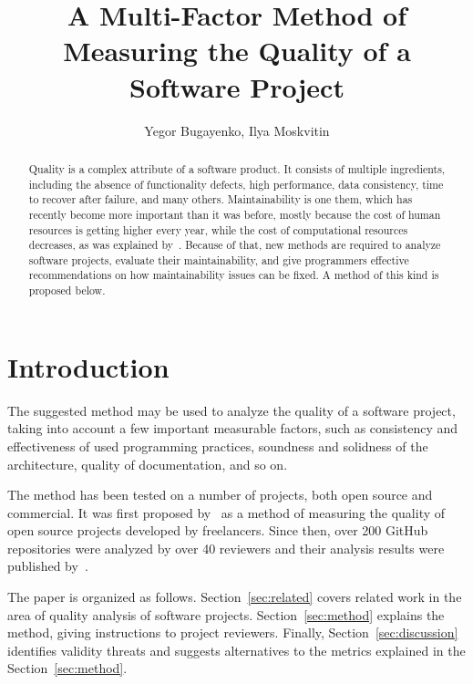 \documentclass[12pt,oneside]{article}
\title{A Multi-Factor Method of Measuring the Quality of a Software Project}
\author{Yegor Bugayenko, Ilya Moskvitin}
\begin{document}
\raggedbottom
\raggedright
\setlength{\topskip}{6pt}
\setlength{\parindent}{0pt} %
\setlength{\parskip}{6pt} %

\maketitle

\begin{abstract}
Quality is a complex attribute of a software product. It consists of
multiple ingredients, including the absence of functionality defects,
high performance, data consistency, time to recover after failure, and
many others. Maintainability is one them, which has recently become
more important than it was before, mostly because the cost of
human resources is getting higher every year, while the cost of
computational resources decreases, as was explained by~\citet{yb-hacking}.
Because of that, new methods are required to analyze software projects, evaluate their
maintainability, and give programmers effective recommendations on
how maintainability issues can be fixed. A method of this kind is proposed
below.
\end{abstract}

\section{Introduction}

The suggested method may be used to analyze the quality
of a software project, taking into account a few important
measurable factors, such as consistency and effectiveness of
used programming practices, soundness and solidness of the
architecture, quality of documentation, and so on.

The method has been tested on a number of projects, both
open source and commercial. It was first proposed by~\citet{yb-sins}
as a method of measuring the quality of open source projects developed
by freelancers. Since then, over 200 GitHub repositories were
analyzed by over 40 reviewers and their analysis results were published
by~\citet{yb-award}.

The paper is organized as follows.
Section~\ref{sec:related} covers related work in the area of quality analysis
of software projects.
Section~\ref{sec:method} explains the method, giving instructions
to project reviewers.
Finally, Section~\ref{sec:discussion} identifies validity threats and suggests
alternatives to the metrics explained in the Section~\ref{sec:method}.
\end{document}
